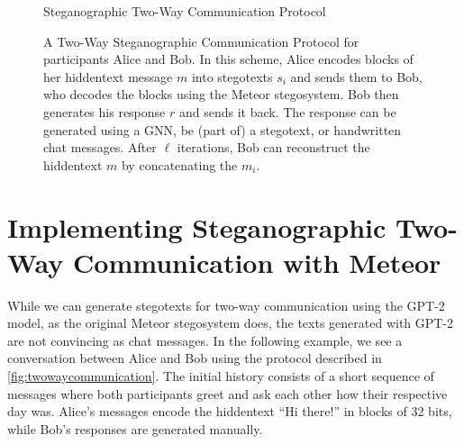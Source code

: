\begin{figure}[htbp]
  \centering
  \begin{msc}[instance distance=4cm,action width=5cm]{Steganographic Two-Way Communication Protocol}
    \nextlevel[2]
    \nextlevel[3]
    \nextlevel[2]
    \nextlevel[3]
    \nextlevel
    \nextlevel[2]
    \nextlevel[3]
    \nextlevel
    \nextlevel[2]
    \nextlevel[3]
    \nextlevel
  \end{msc}
  \caption{
  A Two-Way Steganographic Communication Protocol for participants Alice and Bob.
  In this scheme, Alice encodes blocks of her hiddentext message $m$ into stegotexts $s_i$ and sends them to Bob, who decodes the blocks using the Meteor stegosystem.
  Bob then generates his response $r$ and sends it back.
  The response can be generated using a GNN, be (part of) a stegotext, or handwritten chat messages.
  After $\ell$ iterations, Bob can reconstruct the hiddentext $m$ by concatenating the $m_i$.
  }
  \label{fig:twowaycommunication}
\end{figure}

\section{Implementing Steganographic Two-Way Communication with Meteor}
While we can generate stegotexts for two-way communication using the GPT-2 model, as the original Meteor stegosystem does, the texts generated with GPT-2 are not convincing as chat messages. 
In the following example, we see a conversation between Alice and Bob using the protocol described in \autoref{fig:twowaycommunication}.
The initial history consists of a short sequence of messages where both participants greet and ask each other how their respective day was.
Alice's messages encode the hiddentext ``Hi there!'' in blocks of 32 bits, while Bob's responses are generated manually.


